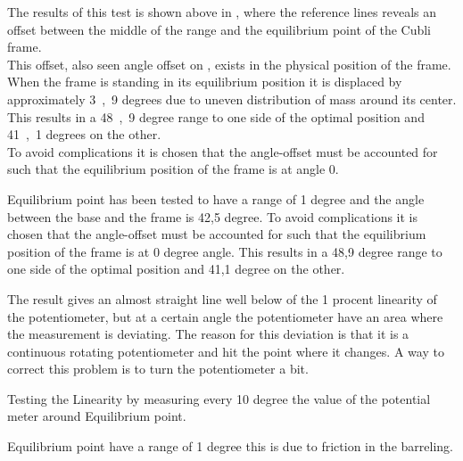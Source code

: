 \begin{minipage}{\linewidth}
\begin{minipage}{0.45\linewidth}
\begin{figure}[H]
  			\centering
  			\captionsetup{justification=centering}
  			\vspace{-.5cm}
  			\label{PotentiometerResolutionRadDeg}
  		\end{figure}\vspace{-5mm}
  	\end{minipage}
\end{minipage}

The results of this test is shown above in , where the reference lines reveals an offset between the middle of the range and the equilibrium point of the Cubli frame.\\
This offset, also seen angle offset on , exists in the physical position of the frame. When the frame is standing in its equilibrium position it is displaced by approximately \si{3,9} degrees due to uneven distribution of mass around its center.\\
This results in a \si{48,9} degree range to one side of the optimal position and \si{41,1} degrees on the other.\\
To avoid complications it is chosen that the angle-offset must be accounted for such that the equilibrium position of the frame is at angle 0.

Equilibrium point has been tested to have a range of 1 degree and the angle between the base and the frame is 42,5 degree. To avoid complications it is chosen that the angle-offset must be accounted for such that the equilibrium position of the frame is at 0 degree angle. This results in a 48,9 degree range to one side of the optimal position and 41,1 degree on the other.

The result gives an almost straight line well below of the 1 procent linearity of the potentiometer, but at a certain angle the potentiometer have an area where the measurement is deviating. The reason for this deviation is that it is a continuous rotating potentiometer and hit the point where it changes. A way to correct this problem is to turn the potentiometer a bit. 

Testing the Linearity by measuring every 10 degree the value of the potential meter around Equilibrium point.

Equilibrium point have a range of 1 degree this is due to friction in the barreling.

